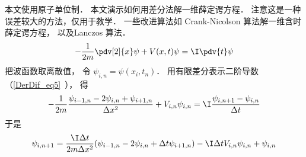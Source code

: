 
\begin{issues}
\issueDraft
\end{issues}


本文使用原子单位制． 本文演示如何用差分法解一维薛定谔方程． 注意这是一种误差较大的方法，仅用于教学． 一些改进算法如 Crank-Nicolson 算法解一维含时薛定谔方程， 以及Lanczos 算法．
\begin{equation}
-\frac{1}{2m}\pdv[2]{x}\psi + V(x,t)\psi = \I\pdv{t}\psi
\end{equation}
把波函数取离散值， 令 $\psi_{i,n} = \psi(x_i,t_n)$． 用有限差分表示二阶导数（\autoref{DerDif_eq5}~）， 得
\begin{equation}
-\frac{1}{2m}\frac{\psi_{i-1,n} - 2\psi_{i,n} + \psi_{i+1,n}}{\Delta x^2} + V_{i,n}\psi_{i,n} = \I \frac{\psi_{i, n+1} - \psi_{i, n}}{\Delta t}
\end{equation}
于是
\begin{equation}
\psi_{i, n+1} = \frac{\I\Delta t}{2m\Delta x^2} (\psi_{i-1,n} - 2\psi_{i,n} + \Delta t\psi_{i+1,n}) - \I \Delta t V_{i,n}\psi_{i,n} + \psi_{i, n}
\end{equation}
